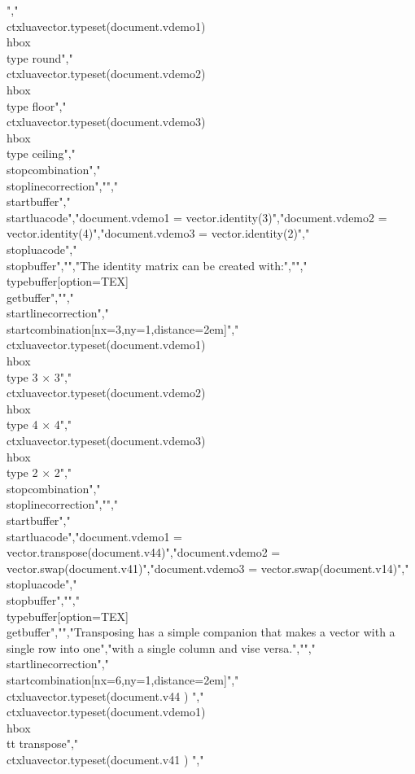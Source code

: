 {}","  {\\ctxlua{vector.typeset(document.vdemo1)}} {\\hbox{\\type {round}}}","  {\\ctxlua{vector.typeset(document.vdemo2)}} {\\hbox{\\type {floor}}}","  {\\ctxlua{vector.typeset(document.vdemo3)}} {\\hbox{\\type {ceiling}}}","\\stopcombination","\\stoplinecorrection","","\\startbuffer","\\startluacode","document.vdemo1 = vector.identity(3)","document.vdemo2 = vector.identity(4)","document.vdemo3 = vector.identity(2)","\\stopluacode","\\stopbuffer","","The identity matrix can be created with:","","\\typebuffer[option=TEX] \\getbuffer","","\\startlinecorrection","\\startcombination[nx=3,ny=1,distance=2em]","  {\\ctxlua{vector.typeset(document.vdemo1)}} {\\hbox{\\type {3 × 3}}}","  {\\ctxlua{vector.typeset(document.vdemo2)}} {\\hbox{\\type {4 × 4}}}","  {\\ctxlua{vector.typeset(document.vdemo3)}} {\\hbox{\\type {2 × 2}}}","\\stopcombination","\\stoplinecorrection","","\\startbuffer","\\startluacode","document.vdemo1 = vector.transpose(document.v44)","document.vdemo2 = vector.swap(document.v41)","document.vdemo3 = vector.swap(document.v14)","\\stopluacode","\\stopbuffer","","\\typebuffer[option=TEX] \\getbuffer","","Transposing has a simple companion that makes a vector with a single row into one","with a single column and vise versa.","","\\startlinecorrection","\\startcombination[nx=6,ny=1,distance=2em]","    {\\ctxlua{vector.typeset(document.v44   )}} {}","    {\\ctxlua{vector.typeset(document.vdemo1)}} {\\hbox{\\tt transpose}}","    {\\ctxlua{vector.typeset(document.v41   )}} {}","    